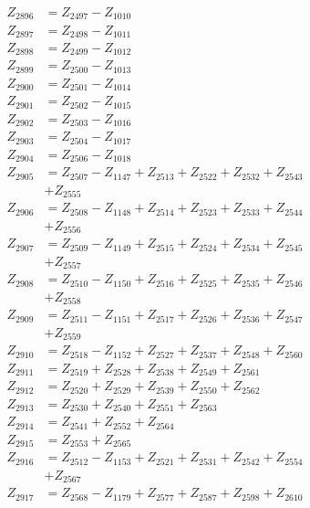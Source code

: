 \begin{multicols}{2}
\begin{align}
Z_{2896} &= Z_{2497} - Z_{1010} \nonumber \\
Z_{2897} &= Z_{2498} - Z_{1011} \nonumber \\
Z_{2898} &= Z_{2499} - Z_{1012} \nonumber \\
Z_{2899} &= Z_{2500} - Z_{1013} \nonumber \\
Z_{2900} &= Z_{2501} - Z_{1014} \nonumber \\
Z_{2901} &= Z_{2502} - Z_{1015} \nonumber \\
Z_{2902} &= Z_{2503} - Z_{1016} \nonumber \\
Z_{2903} &= Z_{2504} - Z_{1017} \nonumber \\
Z_{2904} &= Z_{2506} - Z_{1018} \nonumber \\
Z_{2905} &= Z_{2507} - Z_{1147} + Z_{2513} + Z_{2522} + Z_{2532} + Z_{2543}  \nonumber \\
&+ Z_{2555} \nonumber \\
Z_{2906} &= Z_{2508} - Z_{1148} + Z_{2514} + Z_{2523} + Z_{2533} + Z_{2544}  \nonumber \\
&+ Z_{2556} \nonumber \\
Z_{2907} &= Z_{2509} - Z_{1149} + Z_{2515} + Z_{2524} + Z_{2534} + Z_{2545}  \nonumber \\
&+ Z_{2557} \nonumber \\
Z_{2908} &= Z_{2510} - Z_{1150} + Z_{2516} + Z_{2525} + Z_{2535} + Z_{2546}  \nonumber \\
&+ Z_{2558} \nonumber \\
Z_{2909} &= Z_{2511} - Z_{1151} + Z_{2517} + Z_{2526} + Z_{2536} + Z_{2547}  \nonumber \\
&+ Z_{2559} \nonumber \\
Z_{2910} &= Z_{2518} - Z_{1152} + Z_{2527} + Z_{2537} + Z_{2548} + Z_{2560} \nonumber \\
Z_{2911} &= Z_{2519} + Z_{2528} + Z_{2538} + Z_{2549} + Z_{2561} \nonumber \\
Z_{2912} &= Z_{2520} + Z_{2529} + Z_{2539} + Z_{2550} + Z_{2562} \nonumber \\
Z_{2913} &= Z_{2530} + Z_{2540} + Z_{2551} + Z_{2563} \nonumber \\
Z_{2914} &= Z_{2541} + Z_{2552} + Z_{2564} \nonumber \\
Z_{2915} &= Z_{2553} + Z_{2565} \nonumber \\
Z_{2916} &= Z_{2512} - Z_{1153} + Z_{2521} + Z_{2531} + Z_{2542} + Z_{2554}  \nonumber \\
&+ Z_{2567} \nonumber \\
Z_{2917} &= Z_{2568} - Z_{1179} + Z_{2577} + Z_{2587} + Z_{2598} + Z_{2610} \nonumber \\

\end{align}
\end{multicols}
